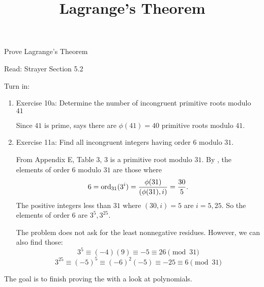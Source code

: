 \documentclass{ximera}
\title{Lagrange's Theorem}
\begin{document}
\begin{abstract}
\end{abstract}
\maketitle

\begin{obj}
    \item Prove Lagrange's Theorem
\end{obj}


\begin{pre}
    \item[Read:] Strayer Section 5.2
    \item[Turn in:] 
    
    \begin{enumerate}
        \item Exercise 10a: Determine the number of incongruent primitive roots modulo $41$
        \begin{solution}
            Since $41$ is prime,  says there are $\phi(41)=40$ primitive roots modulo $41.$
        \end{solution}
        \item Exercise 11a: Find all incongruent integers having order $6$ modulo $31.$
        \begin{solution}
                From Appendix E, Table 3, $3$ is a primitive root modulo $31.$ By , the elements of order $6$ modulo $31$ are those where 
                \[6=\operatorname{ord}_{31}(3^i)=\frac{\phi(31)}{(\phi(31),i)}=\frac{30}{5}.\] 
                The positive integers less than $31$ where $(30,i)=5$ are $i=5,25.$ So the elements of order $6$ are $3^5, 3^{25}.$

                The problem does not ask for the least nonnegative residues. However, we can also find those:
                    \[
                        3^5\equiv (-4)(9)\equiv -5\equiv 26\pmod{31}
                    \]
                    \[
                        3^{25}\equiv (-5)^{5}\equiv (-6)^2(-5)\equiv -25\equiv 6\pmod{31}
                    \]
            \end{solution}
    \end{enumerate}
\end{pre}

The goal is to finish proving the  with a look at polynomials.
\end{document}
